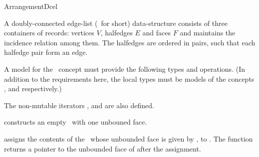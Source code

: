 
\ccRefPageBegin

\begin{ccRefConcept}{ArrangementDcel}

A doubly-connected edge-list (\dcel\ for short) data-structure consists
of three containers of records: vertices $V$, halfedges $E$ and faces $F$
and maintains the incidence relation among them. The halfedges are ordered
in pairs, such that each halfedge pair form an edge.

A model for the \ccRefName\ concept must provide the following types and 
operations. (In addition to the requirements here, the local types 
must be models of the concepts 
,
 and
 respectively.)

\ccTypes

\ccGlue
{}
\ccGlue
{}


\ccGlue
{}
\ccGlue
{}

The non-mutable iterators ,
 and  are also
defined.

\ccCreation
{}
    
   {constructs an empty \dcel\ with one unbouned face.}

   {assigns the contents of the  \dcel\, whose unbounded face
    is given by , to \ccVar{}. The function returns a pointer to
    the unbounded face of \ccVar{} after the assignment.}



\end{ccRefConcept}
